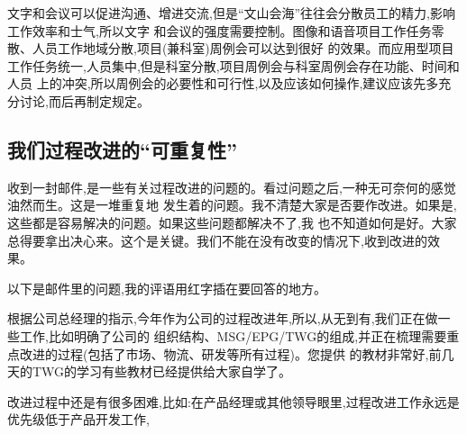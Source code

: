 \documentclass[11pt]{article}
\begin{document}
\begin{myquote}
文字和会议可以促进沟通、增进交流,但是``文山会海''往往会分散员工的精力,影响工作效率和士气,所以文字
和会议的强度需要控制。图像和语音项目工作任务零散、人员工作地域分散,项目(兼科室)周例会可以达到很好
的效果。而应用型项目工作任务统一,人员集中,但是科室分散,项目周例会与科室周例会存在功能、时间和人员
上的冲突,所以周例会的必要性和可行性,以及应该如何操作,建议应该先多充分讨论,而后再制定规定。
\end{myquote}

\begin{comment}

  这个我比较同意。异地开发的例会效果的确会打节扣,但不能说一定没有。比如,在当地组织当地的例会,收集
  进展情况和风险,然后再汇总,虽然大家只能清楚当地的情况,只能建立当地团队的感情,还是比完全没有的好。
  老实讲,我觉得如果能够主持的好,例会的效果是明显的。正如上面所说的,必正例会就是小组的。

  规程的定义,也应该是按项目实际情况灵活裁剪。
\end{comment}

\subsection{我们过程改进的``可重复性''}

\begin{statement}

  收到一封邮件,是一些有关过程改进的问题的。看过问题之后,一种无可奈何的感觉油然而生。这是一堆重复地
  发生着的问题。我不清楚大家是否要作改进。如果是,这些都是容易解决的问题。如果这些问题都解决不了,我
  也不知道如何是好。大家总得要拿出决心来。这个是关键。我们不能在没有改变的情况下,收到改进的效果。

  以下是邮件里的问题,我的评语用红字插在要回答的地方。
\end{statement}

\begin{myquote}
根据公司总经理的指示,今年作为公司的过程改进年,所以,从无到有,我们正在做一些工作,比如明确了公司的
组织结构、MSG/EPG/TWG的组成,并正在梳理需要重点改进的过程(包括了市场、物流、研发等所有过程)。您提供
的教材非常好,前几天的TWG的学习有些教材已经提供给大家自学了。

改进过程中还是有很多困难,比如:在产品经理或其他领导眼里,过程改进工作永远是优先级低于产品开发工作,
\end{myquote}

\begin{comment}

  过程改进的确没有业务重要。所以,分配到过程改进的工作量资源,应该是远远比业务工作少的。这个是正常的。
  解决的方法是分配:时间的分配,工作量的分配,人员的分配。能有效分配,就可以平衡,就可以有效。但是我们
  的管理理念,只能管注一件事情,要么就全部资源都分配到业务,否则就害怕业务完成不了。这是单维思维,结
  果就是气球效应,防碍了长远的任务。就是分配到过程改进的资源,一有机会,又夺回来用在业务上了。比如要
  求QA做项目的活动。

  要强调一下,分配的概念,是分配好的资源,是要有保障的,不可轻易挪用的。
\end{comment}
\end{document}
